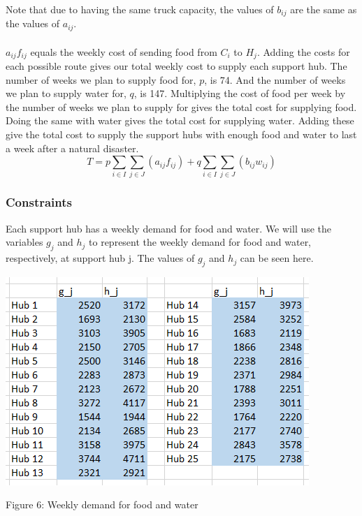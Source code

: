 \documentclass{article}
\begin{document}
\noindent
Note that due to having the same truck capacity, the values of \(b_{ij}\) are the same as the values of \(a_{ij}\). 
\\\\
\indent \(a_{ij}f_{ij}\) equals the weekly cost of sending food from \(C_i\) to \(H_j\). Adding the costs for each possible route gives our total weekly cost to supply each support hub. The number of weeks we plan to supply food for, \(p\), is 74. And the number of weeks we plan to supply water for, \(q\), is 147. Multiplying the cost of food per week by the number of weeks we plan to supply for gives the total cost for supplying food. Doing the same with water gives the total cost for supplying water. Adding these give the total cost to supply the support hubs with enough food and water to last a week after a natural disaster.
\[T=p\sum_{i\in I} \sum_{j\in J} (a_{ij}f_{ij}) + q\sum_{i\in I} \sum_{j\in J} (b_{ij}w_{ij})\]




\subsubsection{Constraints}
Each support hub has a weekly demand for food and water. We will use the variables \(g_j\) and \(h_j\) to represent the weekly demand for food and water, respectively, at support hub j. The values of \(g_j\) and \(h_j\) can be seen here.




\begin{center}
    \includegraphics[scale=.4]{weekly_demand_for_food_and_water.png}
    
    \caption{Figure 6: Weekly demand for food and water}
\end{center}
\end{document}
